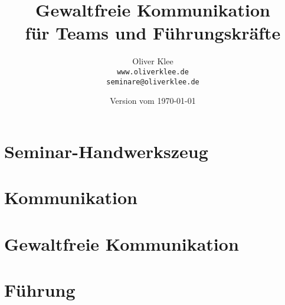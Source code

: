 \documentclass[a4paper,openany,twoside,titlepage,10pt,headsepline]{scrbook}
\title{Gewaltfreie Kommunikation\\für Teams und Führungskräfte}
\author{Oliver Klee\\\texttt{www.oliverklee.de}\\\texttt{seminare@oliverklee.de}}
\date{Version vom \today}
\begin{document}
\frontmatter

\maketitle

\tableofcontents


\mainmatter

\chapter{Seminar-Handwerkszeug}





\chapter{Kommunikation}



\chapter{Gewaltfreie Kommunikation}










\chapter{Führung}


\backmatter





\printindex
\end{document}
